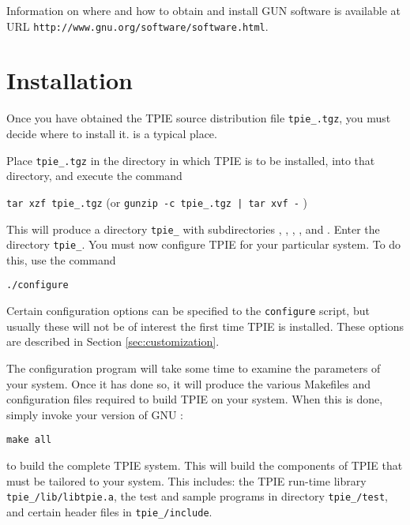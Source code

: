 Information on where and how to obtain and install GUN software is
available at URL {\tt http://www.gnu.org/software/software.html}.


\section{Installation}\label{sec:installation}

Once you have obtained the TPIE source distribution file
{\tt tpie\_\version.tgz}, you must decide where to install it.
 is a typical place.

Place {\tt tpie\_\version.tgz} in the directory in which TPIE is to
be installed,  into that directory, and execute the command

\begin{flushleft}
{\tt tar xzf tpie\_\version.tgz}
(or {\tt gunzip -c tpie\_\version.tgz | tar xvf -} )  
\end{flushleft}

This will produce a directory {\tt tpie\_\version} with
subdirectories , , ,
, and .  Enter the directory 
{\tt tpie\_\version}.  You must now configure TPIE for your
particular system.  To do this, use the command

\begin{verbatim}
./configure
\end{verbatim}

 Certain configuration options can be
specified to the {\tt configure} script, but usually these
will not be of interest the first time TPIE is installed.
These options are described in Section \ref{sec:customization}.

The configuration program will take some time to
examine the parameters of your system.  Once it has done so, it will
produce the various Makefiles and configuration files required to
build TPIE on your system.  When this is done, simply invoke your version
of GNU :

\begin{verbatim}
make all
\end{verbatim}
to build the complete TPIE system.  This will build the
components of TPIE that must be tailored to your
system. This includes: the TPIE run-time library 
{\tt tpie\_\version/lib/libtpie.a}, the test and sample
programs in directory {\tt tpie\_\version/test}, 
and certain header files in {\tt tpie\_\version/include}.


